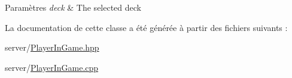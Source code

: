 \begin{DoxyParams}{Paramètres}
{\em deck} & The selected deck \\
\hline
\end{DoxyParams}


La documentation de cette classe a été générée à partir des fichiers suivants \+:\begin{DoxyCompactItemize}
\item 
server/\hyperlink{PlayerInGame_8hpp}{Player\+In\+Game.\+hpp}\item 
server/\hyperlink{PlayerInGame_8cpp}{Player\+In\+Game.\+cpp}\end{DoxyCompactItemize}
